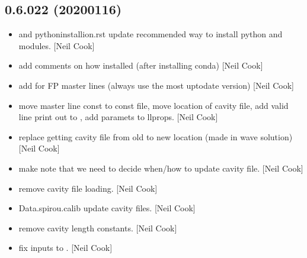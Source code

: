 \documentclass[a4paper,10pt,english]{report}
\begin{document}
\subsection{0.6.022 (2020\sphinxhyphen{}01\sphinxhyphen{}16)}
\label{\detokenize{misc/changelog:id16}}\begin{itemize}
\item {} 
 and pythoninstallion.rst \sphinxhyphen{} update recommended way to
install python and modules. {[}Neil Cook{]}

\item {} 
 \sphinxhyphen{} add comments on how installed (after installing
conda) {[}Neil Cook{]}

\item {} 
 \sphinxhyphen{} add  for FP
master lines (always use the most up\sphinxhyphen{}to\sphinxhyphen{}date version) {[}Neil Cook{]}

\item {} 
 \sphinxhyphen{} move master line const to const file, move
location of cavity file, add valid line print out to ,
add  paramets to llprops. {[}Neil Cook{]}

\item {} 
 \sphinxhyphen{} replace getting cavity file from old to new
location (made in wave solution) {[}Neil Cook{]}

\item {} 
 \sphinxhyphen{} make note that we need to
decide when/how to update cavity file. {[}Neil Cook{]}

\item {} 
 \sphinxhyphen{} remove cavity file loading. {[}Neil Cook{]}

\item {} 
Data.spirou.calib \sphinxhyphen{} update cavity files. {[}Neil Cook{]}

\item {} 
 \sphinxhyphen{} remove cavity length
constants. {[}Neil Cook{]}

\item {} 
 \sphinxhyphen{} fix inputs to . {[}Neil
Cook{]}


\end{itemize}
\end{document}

